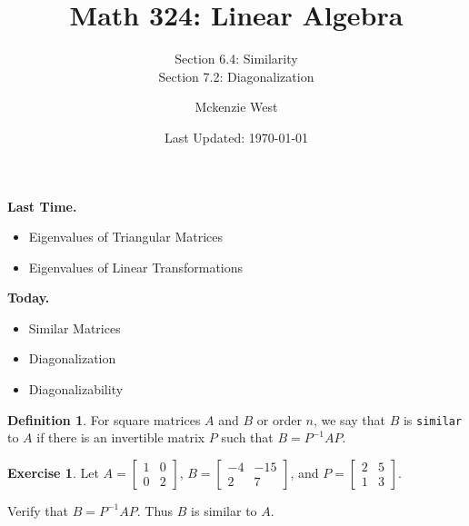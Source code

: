 \documentclass{beamer}
\newcommand{\fn}{\insertframenumber}
\theoremstyle{definition}
\newtheorem{exercise}{Exercise}
\newtheorem*{defn}{Definition}
\renewcommand{\emph}[1]{{\color{blue}\texttt{#1}}}
\begin{document}
	\title{Math 324: Linear Algebra}
	\subtitle{Section 6.4: Similarity\\Section 7.2: Diagonalization}
	\author{Mckenzie West}
	\date{Last Updated: \today}
\begin{frame}[fragile]
\maketitle	
\end{frame}

\begin{frame}{\insertframenumber}
	\begin{block}{\textbf{Last Time.}}
	\begin{itemize}[label=--]
		\item Eigenvalues of Triangular Matrices
		\item Eigenvalues of Linear Transformations
	\end{itemize}
	\end{block}
	\begin{block}{\textbf{Today.}}
		\begin{itemize}[label=--]
			\item Similar Matrices
			\item Diagonalization
			\item Diagonalizability
		\end{itemize}
	\end{block}
\end{frame}
\begin{frame}{\fn}
	\begin{defn}
		For square matrices $A$ and $B$ or order $n$, we say that $B$ is \emph{similar} to $A$ if there is an invertible matrix $P$ such that $B=P^{-1}AP$.
	\end{defn}
	\begin{exercise}\label{first}
		Let $A=\begin{bmatrix} 1&0\\0&2\end{bmatrix}$, $B=\begin{bmatrix}-4&-15\\2&7\end{bmatrix}$, and $P=\begin{bmatrix}2&5\\1&3\end{bmatrix}$.
		
		Verify that $B=P^{-1}AP$.  Thus $B$ is similar to $A$.
	\end{exercise}
\end{frame}
\end{document}
